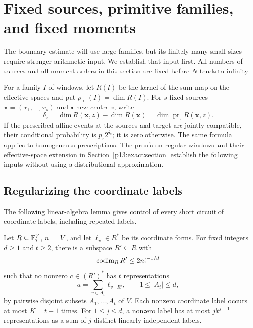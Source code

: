 \section{Fixed sources, primitive families, and fixed moments}
\label{p1:fixed:section}

The boundary estimate will use large families, but its finitely
many small sizes require stronger arithmetic input. We establish
that input first. All numbers of sources and all moment orders
in this section are fixed before \(N\) tends to infinity.

For a family \(I\) of windows, let \(R(I)\) be the kernel
of the sum map on the effective spaces and put \(\rho_{\mathrm{rel}}(I)=\dim R(I)\).
For \(s\) fixed sources \(\boldsymbol x=(x_1,\ldots,x_s)\) and a
new centre \(z\), write
\begin{equation}
 \delta_z=\dim R(\boldsymbol x,z)-\dim R(\boldsymbol x)
          =\dim\operatorname{pr}_z R(\boldsymbol x,z).
 \label{p1:fixed:delta}
\end{equation}
If the prescribed affine events at the sources and target are
jointly compatible, their conditional probability is
\(p_z2^{\delta_z}\); it is zero otherwise. The same formula applies
to homogeneous prescriptions. The proofs on regular windows and their
effective-space extension in Section~\ref{p13:exact:section} establish
the following inputs without using a distributional approximation.

\subsection{Regularizing the coordinate labels}

The following linear-algebra lemma gives control of every short
circuit of coordinate labels, including repeated labels.

\begin{lemma}
\label{p1:fixed:recovery}
Let \(R\subseteq\mathbb F_2^V\), \(n=|V|\), and let
\(\ell_v\in R^*\) be its coordinate forms. For fixed integers
\(d\ge1\) and \(t\ge2\), there is a subspace \(R'\subseteq R\)
with
\begin{equation}
 \operatorname{codim}_R R'\le 2n t^{-1/d}
 \label{p1:fixed:recovery-cost}
\end{equation}
such that no nonzero \(a\in(R')^*\) has \(t\) representations
\[
 a=\sum_{v\in A_i}\ell_v|_{R'},\qquad
 1\le |A_i|\le d,
\]
by pairwise disjoint subsets \(A_1,\ldots,A_t\) of \(V\).
Each nonzero coordinate label occurs at most \(K=t-1\) times.
For \(1\le j\le d\), a nonzero label has at most
\(j!t^{j-1}\) representations as a sum of \(j\) distinct
linearly independent labels.
\end{lemma}

